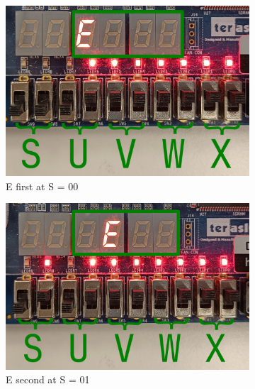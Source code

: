\documentclass{article}
\begin{document}
\clearpage
\begin{figure}[h]
    \centering
    \begin{subfigure}{0.45\textwidth}
        \centering
        \includegraphics[width=1\textwidth]{Figures/Part5_E_00.png}
        \caption{E first at S = 00}
        \label{fig:T05epic1}
    \end{subfigure}
    \hfill
    \begin{subfigure}{0.45\textwidth}
        \centering
        \includegraphics[width=1\textwidth]{Figures/Part5_E_01.png}
        \caption{E second at S = 01}
        \label{fig:T05epic2}
    \end{subfigure}
    \begin{subfigure}{0.45\textwidth}
        \centering

\end{subfigure}
\end{figure}
\end{document}
